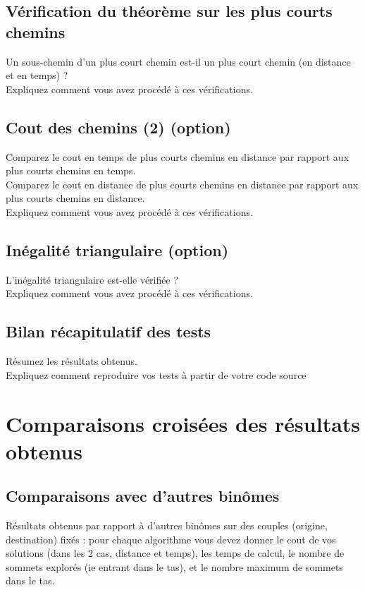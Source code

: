 \subsection{Vérification du théorème sur les plus courts chemins}
Un sous-chemin d'un plus court chemin est-il un plus court chemin (en distance et en temps) ? 
\\
Expliquez comment vous avez procédé à ces vérifications.


\subsection{Cout des chemins (2) (option)}
\noindent
Comparez le cout en temps de plus courts chemins en distance par rapport aux plus courts chemins en temps.
\\
Comparez le cout en distance de plus courts chemins en distance par rapport aux plus courts chemins en distance.
\\
Expliquez comment vous avez procédé à ces vérifications.

\subsection{Inégalité triangulaire (option)}
L'inégalité triangulaire est-elle vérifiée ? 
\\
Expliquez comment vous avez procédé à ces vérifications.


\subsection{Bilan récapitulatif des tests}
Résumez les résultats obtenus.
\\
Expliquez comment reproduire vos tests à partir de votre code source

\section{Comparaisons croisées des résultats obtenus}
\subsection{Comparaisons avec d'autres binômes}
Résultats obtenus par rapport à d'autres binômes sur des couples (origine, destination) fixés : pour chaque algorithme vous devez donner le cout de vos solutions (dans les 2 cas, distance et temps), les temps de calcul, le nombre de sommets explorés (ie entrant dans le tas), et le nombre maximum de sommets dans le tas.

